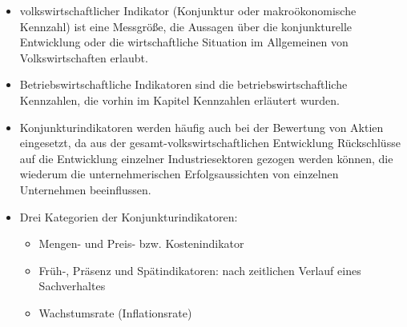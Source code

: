 \begin{itemize}
    \item volkswirtschaftlicher Indikator (Konjunktur oder makroökonomische Kennzahl) ist eine Messgröße, die Aussagen über die konjunkturelle Entwicklung oder die wirtschaftliche Situation im Allgemeinen von Volkswirtschaften erlaubt.

    \item Betriebswirtschaftliche Indikatoren sind die betriebswirtschaftliche Kennzahlen, die vorhin im Kapitel Kennzahlen erläutert wurden.

    \item Konjunkturindikatoren werden häufig auch bei der Bewertung von Aktien eingesetzt, da aus der gesamt-volkswirtschaftlichen Entwicklung Rückschlüsse auf die Entwicklung einzelner Industriesektoren gezogen werden können, die wiederum die unternehmerischen Erfolgsaussichten von einzelnen Unternehmen beeinflussen.

    \item Drei Kategorien der Konjunkturindikatoren:
    \begin{itemize}
        \item Mengen- und Preis- bzw. Kostenindikator
        \item Früh-, Präsenz und Spätindikatoren: nach zeitlichen Verlauf eines Sachverhaltes
                \item Wachstumsrate (Inflationsrate)
    \end{itemize}
\end{itemize}
